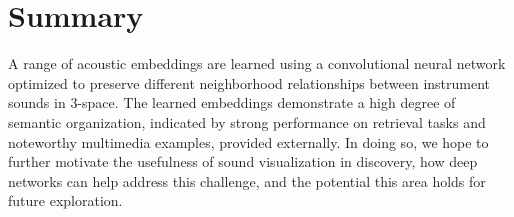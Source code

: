 \documentclass{article}
\begin{document}
\section{Summary}

A range of acoustic embeddings are learned using a convolutional neural network optimized to preserve different neighborhood relationships between instrument sounds in 3-space.
The learned embeddings demonstrate a high degree of semantic organization, indicated by strong performance on retrieval tasks and noteworthy multimedia examples, provided externally.
In doing so, we hope to further motivate the usefulness of sound visualization in discovery, how deep networks can help address this challenge, and the potential this area holds for future exploration.




\end{document}
